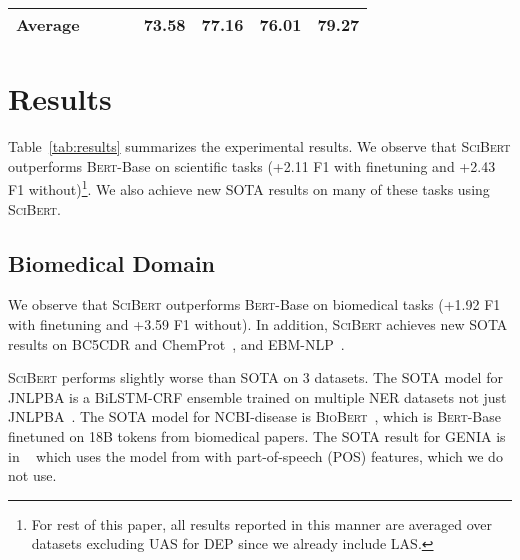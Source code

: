\documentclass[11pt,a4paper]{article}
\newcommand{\bert}{\textsc{Bert}\xspace}
\newcommand{\scibert}{\textsc{SciBert}\xspace}
\newcommand{\biobert}{\textsc{BioBert}\xspace}
\begin{document}
\begin{table*}[ht]
\begin{tabular}{@{}lllccccr@{}}
Average &  &  & & 73.58 & 77.16 & 76.01 & 79.27  \\

\bottomrule
\end{tabular}
\caption{
Test performances of all \bert variants on all tasks and datasets. 
\textbf{Bold} indicates the SOTA result (multiple results bolded if difference within 95\% bootstrap confidence interval).
Keeping with past work, we report macro F1 scores for NER (span-level), macro F1 scores for REL and CLS (sentence-level), and macro F1 for PICO (token-level), and micro F1 for ChemProt specifically.
For DEP, we report labeled (LAS) and unlabeled (UAS) attachment scores (excluding punctuation) for the same model with hyperparameters tuned for LAS.
All results are the average of multiple runs with different random seeds.
}
\label{tab:results}
\end{table*}




\section{Results}
\label{sec:results}
Table~\ref{tab:results} summarizes the experimental results. We observe that \scibert outperforms \bert-Base on scientific tasks (+2.11 F1 with finetuning and +2.43 F1 without)\footnote{For rest of this paper, all results reported in this manner are averaged over datasets excluding UAS for DEP since we already include LAS.}.  We also achieve new SOTA results on many of these tasks using \scibert.

\subsection{Biomedical Domain} 
We observe that \scibert outperforms \bert-Base on biomedical tasks (+1.92 F1 with finetuning and +3.59 F1 without). In addition, \scibert achieves new SOTA results on BC5CDR and ChemProt~\cite{Lee2019BioBERTAP}, and EBM-NLP~\cite{Nye2018ACW}.

\scibert performs slightly worse than SOTA on 3 datasets.  The SOTA model for JNLPBA is a BiLSTM-CRF ensemble trained on multiple NER datasets not just JNLPBA~\cite{Yoon2018CollaboNetCO}.  The SOTA model for NCBI-disease is \biobert~\cite{Lee2019BioBERTAP}, which is \bert-Base finetuned on 18B tokens from biomedical papers.  The SOTA result for GENIA is in ~\citet{Nguyen2019FromPT} which uses the model from \citet{Dozat2017DeepBA} with part-of-speech (POS) features, which we do not use.
\end{document}
